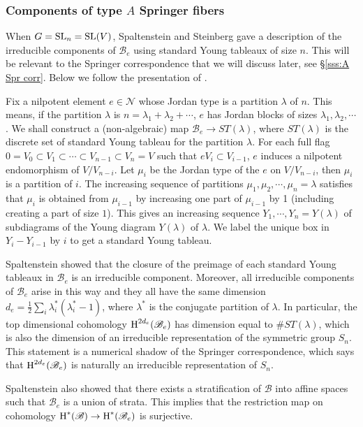 \documentclass[]{pcmi}
\let\oldsubsubsection\subsubsection
\renewcommand{\subsubsection}[1]{%
\setcounter{subsubsection}{\value{equation}}%
\oldsubsubsection{#1}%
\refstepcounter{equation}%
}
\theoremstyle{plain}
\theoremstyle{definition}
\newcommand{\sB}{\ensuremath{\mathscr{B}}\xspace}
\newcommand{\sN}{\ensuremath{\mathscr{N}}\xspace}
\newcommand{\sB}{\ensuremath{\mathcal{B}}\xspace}
\newcommand{\sN}{\ensuremath{\mathcal{N}}\xspace}
\newcommand\SL{\textup{SL}}
\renewcommand{\l}{\lambda}
\newcommand{\cohog}[2]{\textup{H}^{#1}({#2})}     %
\begin{document}
\subsubsection{Components of type $A$ Springer fibers}\label{sss:Spr type A} When $G=\SL_{n}=\SL(V)$, Spaltenstein \cite{Spa76} and Steinberg \cite[]{St} gave a description of the irreducible components of  $\sB_{e}$ using standard Young tableaux of size $n$. This will be relevant to the Springer correspondence that we will discuss later, see \S\ref{sss:A Spr corr}. Below we follow the presentation of \cite[Ch II, \S5]{Spaltenstein}.

Fix a nilpotent element $e\in\sN$ whose Jordan type is a partition $\l$ of $n$. This means, if the partition $\l$ is $n=\l_{1}+\l_{2}+\cdots$, $e$ has Jordan blocks of sizes $\l_{1},\l_{2},\cdots$. We shall construct a (non-algebraic) map $\sB_{e}\to ST(\l)$, where $ST(\l)$ is the discrete set of standard Young tableau for the partition $\l$. For each full flag $0=V_{0}\subset V_{1}\subset\cdots\subset V_{n-1}\subset V_{n}=V$ such that $eV_{i}\subset V_{i-1}$, $e$ induces a nilpotent endomorphism of $V/V_{n-i}$. Let $\mu_{i}$ be the Jordan type of the $e$ on $V/V_{n-i}$, then $\mu_{i}$ is a partition of $i$. The increasing sequence of partitions $\mu_{1},\mu_{2},\cdots, \mu_{n}=\l$ satisfies that $\mu_{i}$ is obtained from $\mu_{i-1}$ by increasing one part of $\mu_{i-1}$ by 1 (including creating a part of size $1$). This gives an increasing sequence $Y_{1},\cdots, Y_{n}=Y(\l)$ of subdiagrams of the Young diagram $Y(\l)$ of $\l$. We label the unique box in $Y_{i}-Y_{i-1}$ by $i$ to get a standard Young tableau.
 
Spaltenstein \cite[Ch II, Prop 5.5]{Spaltenstein} showed that the closure of the preimage of each standard Young tableaux in $\sB_{e}$ is an irreducible component. Moreover, all irreducible components of $\sB_{e}$ arise in this way and they all have the same dimension $d_{e}=\frac{1}{2}\sum_{i}\l^{*}_{i}(\l^{*}_{i}-1)$, where $\l^{*}$ is the conjugate partition of $\l$. In particular, the top dimensional cohomology $\cohog{2d_{e}}{\sB_{e}}$ has dimension equal to $\#ST(\l)$, which is also the dimension of an irreducible representation of the symmetric group $S_{n}$. This statement is a numerical shadow of the Springer correspondence, which says that $\cohog{2d_{e}}{\sB_{e}}$ is naturally an irreducible representation of $S_{n}$. 

Spaltenstein \cite[Ch II, Prop 5.9]{Spaltenstein} also showed that there exists a stratification of $\sB$ into affine spaces such that $\sB_{e}$ is a union of strata. This implies that the restriction map on cohomology $\cohog{*}{\sB}\to \cohog{*}{\sB_{e}}$ is surjective. 
\end{document}
